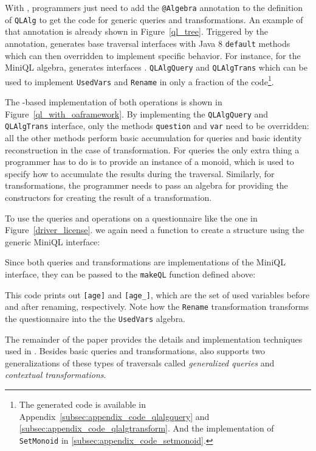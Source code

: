 With \Name, programmers just need to add the \lstinline{@Algebra} annotation
to the definition of \lstinline{QLAlg} to get the code for generic
queries and transformations. An example of that annotation is already
shown in Figure~\ref{ql_tree}.
Triggered by the annotation, \name generates base traversal interfaces with Java 8 \lstinline{default} methods which can then overridden to implement specific behavior.
For instance, for the MiniQL algebra, \name generates interfaces .
\lstinline{QLAlgQuery} and
\lstinline{QLAlgTrans} which can be used to implement \lstinline{UsedVars} and \lstinline{Rename} in only a fraction of the code\footnote{The generated code is available in Appendix~\ref{subsec:appendix_code_qlalgquery} and \ref{subsec:appendix_code_qlalgtransform}. And the implementation of \lstinline{SetMonoid} in \ref{subsec:appendix_code_setmonoid}.}.

The \name-based implementation of both operations is shown in Figure~\ref{ql_with_oaframework}.
By implementing the
\lstinline{QLAlgQuery} and \lstinline{QLAlgTrans} interface, only the methods
\lstinline{question} and \lstinline{var} need to be overridden: all the other methods perform basic accumulation for queries and basic identity reconstruction in the case of transformation.
For queries the
only extra thing a programmer has to do is to provide an instance of a
monoid, which is used to specify how to accumulate the results during
the traversal. Similarly, for transformations, the programmer needs to
pass an algebra for providing the constructors for creating the result of a transformation.

To use the queries and operations on a questionnaire like the one in Figure~\ref{driver_license}. we again need a function to create a structure using the generic MiniQL interface:


Since both queries and transformations are implementations of the MiniQL interface, they can be passed to the \lstinline{makeQL} function defined above:

This code prints out  \lstinline{[age]} and \lstinline{[age_]}, which
are the set of used variables before and after renaming, respectively.
Note how the \lstinline{Rename} transformation transforms the questionnaire into the the \lstinline{UsedVars} algebra.

The remainder of the paper provides the details and implementation
techniques used in \Name. Besides basic queries and transformations,
\name also supports two generalizations of these types of traversals
called \emph{generalized queries} and \emph{contextual transformations}.

